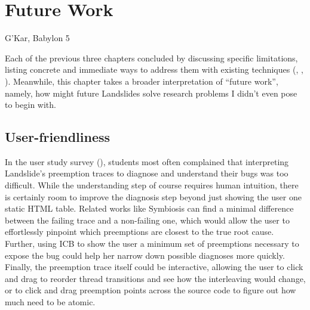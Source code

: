 \chapter{Future Work}
\label{chap:warpzone}
{G'Kar, Babylon 5}

Each of the previous three chapters concluded by
discussing specific limitations,
listing concrete and immediate ways to address them
with existing techniques
(\sect{\ref{sec:quicksand-discussion}},
\sect{\ref{sec:education-discussion}},
\sect{\ref{sec:tm-discussion}}).
Meanwhile, this chapter takes a broader interpretation of ``future work'',
namely,
how might future Landslides solve research problems I didn't even pose to begin with.

\section{User-friendliness}

In the user study survey (\sect{\ref{sec:education-eval-survey}}),
students most often complained
that interpreting Landslide's preemption traces to diagnose and understand their bugs was too difficult.
While the understanding step of course requires human intuition,
there is certainly room to improve the diagnosis step beyond just showing the user one static HTML table.
Related works like Symbiosis \cite{symbiosis} can find a minimal difference between the failing trace and a non-failing one,
which would allow the user to effortlessly pinpoint which preemptions are closest to the true root cause.
Further, using ICB \cite{chess-icb} to show the user a minimum set of preemptions necessary to expose the bug
could help her narrow down possible diagnoses more quickly.
Finally, the preemption trace itself could be interactive,
allowing the user to click and drag to reorder thread transitions and see how the interleaving would change,
or to click and drag preemption points across the source code to figure out how much need to be atomic.

